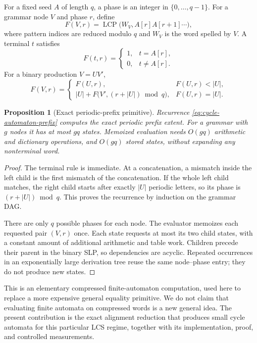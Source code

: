 \documentclass[11pt]{article}
\newtheorem{proposition}[theorem]{Proposition}
\theoremstyle{definition}
\theoremstyle{remark}
\newcommand{\LCP}{\operatorname{LCP}}
\begin{document}
For a fixed seed $A$ of length $q$, a phase is an integer in
$\{0,\ldots,q-1\}$. For a grammar node $V$ and phase $r$, define
\[
 F(V,r)=\LCP\bigl(W_V, A[r]A[r+1]\cdots\bigr),
\]
where pattern indices are reduced modulo $q$ and $W_V$ is the word
spelled by $V$. A terminal $t$ satisfies
\[
 F(t,r)=\begin{cases}1,&t=A[r],\\0,&t\ne A[r].\end{cases}
\]
For a binary production $V=UV'$,
\begin{equation}
 F(V,r)=
 \begin{cases}
 F(U,r),&F(U,r)<|U|,\\[2pt]
 |U|+F\bigl(V',(r+|U|)\bmod q\bigr),&F(U,r)=|U|.
 \end{cases}
 \label{eq:cycle-automaton-prefix}
\end{equation}

\begin{proposition}[Exact periodic-prefix primitive]
\label{prop:cycle-automaton}
Recurrence \eqref{eq:cycle-automaton-prefix} computes the exact periodic
prefix extent. For a grammar with $g$ nodes it has at most $gq$ states.
Memoized evaluation needs $O(gq)$ arithmetic and dictionary operations,
and $O(gq)$ stored states, without expanding any nonterminal word.
\end{proposition}

\begin{proof}
The terminal rule is immediate. At a concatenation, a mismatch inside
the left child is the first mismatch of the concatenation. If the whole
left child matches, the right child starts after exactly $|U|$ periodic
letters, so its phase is $(r+|U|)\bmod q$. This proves the recurrence
by induction on the grammar DAG.

There are only $q$ possible phases for each node. The evaluator memoizes
each requested pair $(V,r)$ once. Each state requests at most its two
child states, with a constant amount of additional arithmetic and table
work. Children precede their parent in the binary SLP, so dependencies
are acyclic. Repeated occurrences in an exponentially large derivation
tree reuse the same node--phase entry; they do not produce new states.
\end{proof}

This is an elementary compressed finite-automaton computation, used here
to replace a more expensive general equality primitive. We do not claim
that evaluating finite automata on compressed words is a new general
idea. The present contribution is the exact alignment reduction that
produces small cycle automata for this particular LCS regime, together
with its implementation, proof, and controlled measurements.
\end{document}
